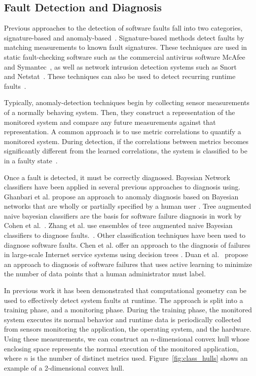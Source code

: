 \subsection{Fault Detection and Diagnosis}
\label{sub:fault_detection}

Previous approaches to the detection of software faults fall into two categories, signature-based and anomaly-based~\cite{al-nashif2008}. Signature-based methods detect faults by matching measurements to known fault signatures. These techniques are used in static fault-checking software such as the commercial antivirus software McAfee~\cite{Mcafee} and Symantec~\cite{symantec}, as well as network intrusion detection systems such as Snort~\cite{Roesch1999}  and Netstat~\cite{Vigna1999}. These techniques can also be used to detect recurring runtime faults~\cite{Brodie2005}.

Typically, anomaly-detection techniques begin by collecting sensor measurements of a normally behaving system. Then, they construct a representation of the monitored system and compare any future measurements against that representation. A common approach is to use metric correlations to quantify a monitored system. During detection, if the correlations between metrics becomes significantly different from the learned correlations, the system is classified to be in a faulty state~\cite{zhen2006,zhao2009,Cohen2004,Jiang2009}.

Once a fault is detected, it must be correctly diagnosed. Bayesian Network classifiers have been applied in several previous approaches to diagnosis using. Ghanbari et al. propose an approach to anomaly diagnosis based on Bayesian networks that are wholly or partially specified by a human user \cite{Ghanbari2008}. Tree augmented naive bayesian classifiers are the basis for software failure diagnosis in work by  Cohen et al.~\cite{Cohen2004}. Zhang et al. use ensembles of tree augmented naive Bayesian classifiers to diagnose faults.~\cite{Zhang2005}. Other classification techniques have been used to diagnose software faults. Chen et al.  offer an approach to the diagnosis of failures in large-scale Internet service systems using decision trees \cite{Chen2004}.  Duan et al.~\cite{Duan} propose an approach to diagnosis of software failures that uses active learning to minimize the number of data points that a human administrator must label.

In previous work it has been demonstrated that computational geometry can be used to effectively detect system faults at runtime\cite{stehle2010,shevertalov2010using}. The approach is split into a training phase, and a monitoring phase. During the training phase, the monitored system executes its normal behavior and runtime data is periodically collected from sensors monitoring the application, the operating system, and the hardware. Using these measurements, we can construct an $n$-dimensional convex hull whose enclosing space represents the normal execution of the monitored application, where $n$ is the number of distinct metrics used. Figure~\ref{fig:class_hulls} shows an example of a 2-dimensional convex hull.


